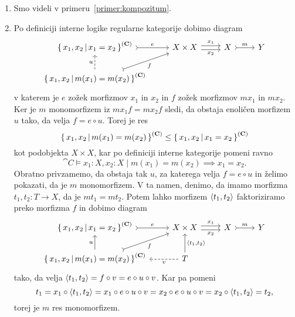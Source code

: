 \documentclass[../kategoricna_logika.tex]{subfiles}
\begin{document}
\begin{dokaz}
  \begin{enumerate}[label=(\roman*)]
  \item Smo videli v primeru~\ref{primer:kompozitum}.

  \item Po definiciji interne logike regularne
    kategorije dobimo diagram
    \begin{equation*}
      \begin{tikzcd}
        \setb{x_1,x_2}{x_1 = x_2}^{(\cat{C})} \ar[r, tail, "e"] & X \times X \ar[r, shift left, "x_1"] \ar[r, shift right, "x_2"'] & X \ar[r, tail, "m"] & Y \\
        \setb{x_1,x_2}{m(x_1) = m(x_2)}^{(\cat{C})} \ar[ur, tail,
        "f"'] \ar[u, dashed, "u"]
      \end{tikzcd}
    \end{equation*}
    v katerem je $e$ zožek morfizmov $x_1$ in $x_2$ in $f$ zožek
    morfizmov $m x_1$ in $m x_2$.  Ker je $m$ monomorfizem iz
    $m x_1 f = m x_2 f$ sledi, da obstaja enoličen morfizem $u$ tako,
    da velja $f = e \circ u$. Torej je res
      $$\left\lbrace\, x_1,x_2 \,\middle|\, m(x_1) = m(x_2) \,\right\rbrace^{({\operatorname{\mathbf{C}}})} \leq \left\lbrace\, x_1,x_2 \,\middle|\, x_1 = x_2 \,\right\rbrace^{({\operatorname{\mathbf{C}}})}$$
      kot podobjekta $X \times X$, kar po definiciji interne
      kategorije pomeni ravno
      \[\cat{C} \models x_1:X, x_2:X \mid  m(x_1) = m(x_2) \implies x_1 = x_2.\]
      Obratno privzamemo, da obstaja tak $u$, za katerega velja
      $f = e \circ u$ in želimo pokazati, da je $m$ monomorfizem.  V
      ta namen, denimo, da imamo morfizma $t_1, t_2 : T \to X$, da je
      $m t_1 = m t_2$.  Potem lahko morfizem $\langle t_1, t_2 \rangle$
      faktoriziramo preko morfizma $f$ in dobimo diagram
      \begin{equation*}
        \begin{tikzcd}
          \setb{x_1,x_2}{x_1 = x_2}^{(\cat{C})} \ar[r, tail, "e"] & X \times X \ar[r, shift left, "x_1"] \ar[r, shift right, "x_2"'] & X \ar[r, tail, "m"] & Y \\
          \setb{x_1,x_2}{m(x_1) = m(x_2)}^{(\cat{C})} \ar[ur, tail,
          "f"'] \ar[u, "u"] & T \ar[u, "\fprod{t_1, t_2}"'] \ar[l,
          dashed, "v"]
        \end{tikzcd}
      \end{equation*}
      tako, da velja
      $\langle t_1, t_2 \rangle = f \circ v = e \circ u \circ v$. Kar pa
      pomeni
      $$t_1 = x_1 \circ \langle t_1, t_2 \rangle = x_1 \circ e \circ u \circ v = x_2 \circ e \circ u \circ v = x_2 \circ \langle t_1, t_2 \rangle = t_2,$$
      torej je $m$ res monomorfizem.


\end{enumerate}
\end{dokaz}
\end{document}
